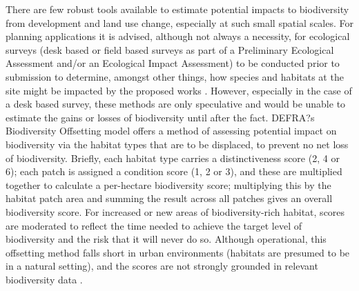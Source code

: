 There are few robust tools available to estimate potential impacts to biodiversity from development and land use change, especially at such small spatial scales.  For planning applications it is advised, although not always a necessity, for ecological surveys (desk based or field based surveys as part of a Preliminary Ecological Assessment and/or an Ecological Impact Assessment) to be conducted prior to submission to determine, amongst other things, how species and habitats at the site might be impacted by the proposed works \citep{Cieem:2016}. However, especially in the case of a desk based survey, these methods are only speculative and would be unable to estimate the gains or losses of biodiversity until after the fact. DEFRA?s Biodiversity Offsetting model \citep{defra:2012bdo} offers a method of assessing potential impact on biodiversity via the habitat types that are to be displaced, to prevent no net loss of biodiversity. Briefly, each habitat type carries a distinctiveness score (2, 4 or 6); each patch is assigned a condition score (1, 2 or 3), and these are multiplied together to calculate a per-hectare biodiversity score; multiplying this by the habitat patch area and summing the result across all patches gives an overall biodiversity score. For increased or new areas of biodiversity-rich habitat, scores are moderated to reflect the time needed to achieve the target level of biodiversity and the risk that it will never do so. Although operational, this offsetting method falls short in urban environments (habitats are presumed to be in a natural setting), and the scores are not strongly grounded in relevant biodiversity data \citep[see][]{Baker:2014bdo}.  

